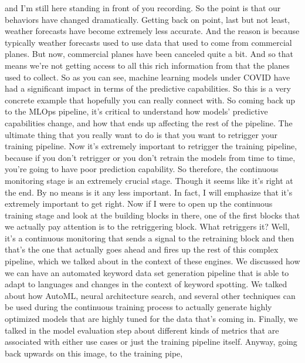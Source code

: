 {{{{{{{{    and I'm still here standing in front of you recording.
    So the point is that our behaviors have changed dramatically.
    Getting back on point, last but not least, weather forecasts
    have become extremely less accurate.
    And the reason is because typically weather forecasts
    used to use data that used to come from commercial planes.
    But now, commercial planes have been canceled quite a bit.
    And so that means we're not getting access
    to all this rich information from that the planes used to collect.
    So as you can see, machine learning models under COVID
    have had a significant impact in terms of the predictive capabilities.
    So this is a very concrete example that hopefully you can really connect with.
    So coming back up to the MLOps pipeline, it's
    critical to understand how models' predictive capabilities change,
    and how that ends up affecting the rest of the pipeline.
    The ultimate thing that you really want to do
    is that you want to retrigger your training pipeline.
    Now it's extremely important to retrigger the training pipeline,
    because if you don't retrigger or you don't
    retrain the models from time to time, you're
    going to have poor prediction capability.
    So therefore, the continuous monitoring stage is an extremely crucial stage.
    Though it seems like it's right at the end.
    By no means is it any less important.
    In fact, I will emphasize that it's extremely important to get right.
    Now if I were to open up the continuous training stage
    and look at the building blocks in there,
    one of the first blocks that we actually pay attention
    is to the retriggering block.
    What retriggers it?
    Well, it's a continuous monitoring that sends a signal to the retraining
    block and then that's the one that actually goes ahead and fires up
    the rest of this complex pipeline, which we talked
    about in the context of these engines.
    We discussed how we can have an automated keyword data set
    generation pipeline that is able to adapt to languages and changes
    in the context of keyword spotting.
    We talked about how AutoML, neural architecture search,
    and several other techniques can be used during the continuous training process
    to actually generate highly optimized models that are highly tuned
    for the data that's coming in.
    Finally, we talked in the model evaluation
    step about different kinds of metrics that are
    associated with either use cases or just the training pipeline itself.
    Anyway, going back upwards on this image, to the training pipe,
}}}}}}}}
